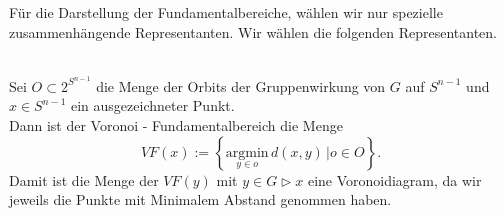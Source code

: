 Für die Darstellung der Fundamentalbereiche, wählen wir nur spezielle zusammenhängende Representanten. Wir wählen die folgenden Representanten.

\begin{definition}\label{fundamentalbereich:voronoi} \mbox{}\\
   Sei $O \subset 2^{S^{n-1}}$ die Menge der Orbits der Gruppenwirkung von $G$ auf $S^{n-1}$ und $x \in S^{n-1}$ ein ausgezeichneter Punkt.\\

   Dann ist der Voronoi - Fundamentalbereich die Menge
   $$
      VF(x) := \left\{ \underset{y\in o}{\text{argmin}} \, d(x,y) \, |  o \in O\right\}.
   $$
   Damit ist die Menge der $VF(y)$ mit $y \in G \rhd x$ eine Voronoidiagram, da wir jeweils die Punkte mit Minimalem Abstand genommen haben.
\end{definition}



